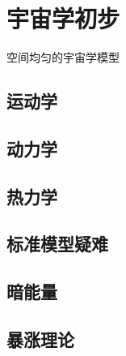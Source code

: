 \chapter{宇宙学初步}\label{chpt:cosmos}
空间均匀的宇宙学模型
\section{运动学}
\section{动力学}
\section{热力学}
\section{标准模型疑难}
\section{暗能量}
\section{暴涨理论}